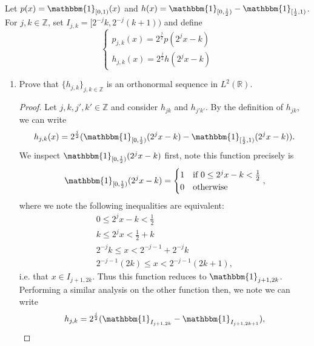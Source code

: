 \documentclass[12pt]{article}
\newenvironment{ex}[2][Exercise]{\begin{trivlist}
\item[\hskip \labelsep {\bfseries #1}\hskip \labelsep {\bfseries #2.}]}{\end{trivlist}}
\begin{document}
\begin{ex}{14}
    Let $p(x) = \mathbbm{1}_{[0,1)}(x)$ and $h(x) = \mathbbm{1}_{[0, \frac{1}{2})} -\mathbbm{1}_{[\frac{1}{2}, 1)}$. For $j, k \in \mathbb{Z}$, set $I_{j,k} = [2^{-j}k, 2^{-j}(k + 1))$ and define 
    \begin{equation*}
        \begin{cases}
            p_{j,k}(x) = 2^{\frac{j}{2}}p(2^jx - k) \\
            h_{j,k}(x) = 2^{\frac{j}{2}}h(2^jx - k)
        \end{cases}
    \end{equation*}
    \begin{enumerate}[label=(\alph*)]
        \item Prove that $\{h_{j,k}\}_{j, k \in \mathbb{Z}}$ is an orthonormal sequence in $L^2(\mathbb{R})$.
        \begin{proof}
            Let $j, k, j', k' \in \mathbb{Z}$ and consider $h_{jk}$ and $h_{j'k'}$. By the definition of $h_{jk}$, we can write 
            $$h_{j,k}(x) = 2^{\frac{j}{2}}(\mathbbm{1}_{[0, \frac{1}{2})}(2^jx - k) - \mathbbm{1}_{[\frac{1}{2}, 1)}(2^jx - k)).$$
            We inspect $\mathbbm{1}_{[0, \frac{1}{2})}(2^jx - k)$ first, note this function precisely is 
            \begin{equation*}
                \mathbbm{1}_{[0, \frac{1}{2})}(2^jx - k) = 
                \begin{cases}
                    1 & \text{if } 0 \leq 2^jx - k < \frac{1}{2} \\
                    0 & \text{otherwise}
                \end{cases},
            \end{equation*}
            where we note the following inequalities are equivalent:
            \begin{align*}
                0 \leq 2^j x - k < \frac{1}{2} \\
                k \leq 2^j x < \frac{1}{2} + k \\
                2^{-j}k \leq x < 2^{-j - 1} + 2^{-j}k \\
                2^{-j - 1}(2k) \leq x < 2^{-j - 1}(2k + 1),
            \end{align*}
            i.e. that $x \in I_{j + 1, 2k}$. Thus this function reduces to $\mathbbm{1}_{j + 1, 2k}$. Performing a similar analysis on the other function then, we note we can write
            $$h_{j,k} = 2^{\frac{j}{2}} (\mathbbm{1}_{I_{j + 1, 2k}} - \mathbbm{1}_{I_{j + 1, 2k + 1}}),$$

\end{proof}
\end{enumerate}
\end{ex}
\end{document}
